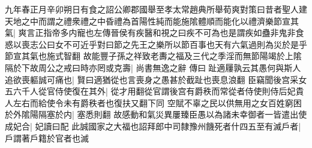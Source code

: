 九年春正月辛卯朔日有食之詔公卿郡國舉至孝太常趙典所舉荀爽對策曰昔者聖人建天地之中而謂之禮衆禮之中昏禮為首陽性純而能施隂體順而能化以禮濟樂節宣其氣|{
	爽言正指帝多内寵也左傳晉侯有疾醫和視之曰疾不可為也是謂疾如蠱非鬼非食惑以喪志公曰女不可近乎對曰節之先王之樂所以節百事也天有六氣過則為災於是乎節宣其氣也施式智翻}
故能豐子孫之祥致老夀之福及三代之季淫而無節陽竭於上隂隔於下故周公之戒曰時亦罔或克壽|{
	尚書無逸之辭}
傳曰趾適屨孰云其愚何與斯人追欲喪軀誠可痛也|{
	賢曰適猶從也言喪身之愚甚於截趾也喪息浪翻}
臣竊聞後宫采女五六千人從官侍使復在其外|{
	從才用翻從官謂後宫有爵秩而常從者侍使則侍后妃貴人左右而給使令未有爵秩者也復扶又翻下同}
空賦不辜之民以供無用之女百姓窮困於外隂陽隔塞於内|{
	塞悉則翻}
故感動和氣災異屢臻臣愚以為諸未幸御者一皆遣出使成妃合|{
	妃讀曰配}
此誠國家之大福也詔拜郎中司隸豫州饑死者什四五至有滅戶者|{
	戶謂著戶籍於官者也滅}


